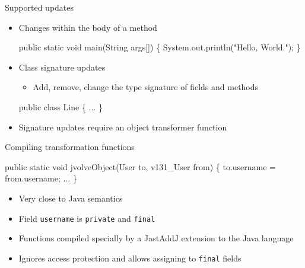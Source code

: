 \begin{frame}[fragile]{Supported updates}%
\begin{itemize}
\item Changes within the body of a method \\
\begin{footnotesize}
\begin{semiverbatim}
  public static void main(String args[]) \{
    System.out.println("Hello, World.");
  \}
\end{semiverbatim}
\end{footnotesize}
\item Class signature updates
  \begin{itemize}
  \item Add, remove, change the type signature of fields and methods
  \end{itemize}
\begin{footnotesize}
\begin{semiverbatim}
  public class Line \{
    ...
  \}
\end{semiverbatim}
\end{footnotesize}
\item Signature updates require an object transformer function
\end{itemize}
\end{frame}



\begin{frame}[fragile]{Compiling transformation functions}%
\begin{block}{}
\begin{footnotesize}
\begin{semiverbatim}
 public static void jvolveObject(User to, v131_User from) \{
    to.username = from.username;
    ...
 \}
\end{semiverbatim}
\end{footnotesize}
\end{block}
\begin{itemize}
\item Very close to Java semantics
\item Field {\tt username} is {\tt private} and {\tt final}
\item Functions compiled specially by a JastAddJ extension to the Java
language
\item Ignores access protection and allows assigning to {\tt final} fields
\end{itemize}
\end{frame}
